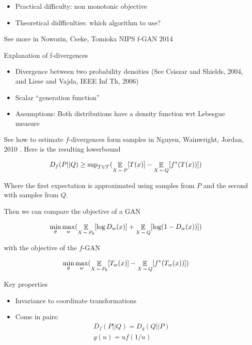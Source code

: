 \documentclass[b5paper]{report}
\begin{document}
\begin{itemize}
  \item Practical difficulty: non monotonic objective
  \item Theoretical didfficulties: which algorithm to use?
\end{itemize}


See more in Nowozin, Cseke, Tomioka NIPS f-GAN 2014 \cite{nowozin2016f}

Explanation of f-divergences

\begin{itemize}
  \item Divergence between two probability densities (See Csiszar and Shields,
    2004, and Liese and Vajda, IEEE Inf Th, 2006)
  \item Scalar ``generation function''
  \item Assumptions: Both distributions have a density function wrt Lebesgue
    measure
\end{itemize}

See how to estimate $f$-divergences form samples in Nguyen, Wainwright, Jordan,
2010 \cite{nguyen2010estimating}. Here is the resulting lowerbound

\begin{equation}
  D_f(P||Q) \ge \text{sup}_{T \in \mathcal{T}}( \operatorname*{\mathbb{\mathop{E}}}_{X\operatorname*{\sim} P}[T(x)] - \operatorname*{\mathbb{\mathop{E}}}_{X\operatorname*{\sim} Q}[f^*(T(x))])
\end{equation}

Where the first expectation is approximated using samples from $P$ and the
second with samples from $Q$.

Then we can compare the objective of a GAN

\begin{equation}
  \min_\theta \max_w ( \operatorname*{\mathbb{\mathop{E}}}_{X\operatorname*{\sim} P_\theta}[\log D_w(x)] + \operatorname*{\mathbb{\mathop{E}}}_{X\operatorname*{\sim}
  Q}[\log (1-D_w(x))])
\end{equation}

with the objective of the $f$-GAN

\begin{equation}
  \min_\theta \max_w ( \operatorname*{\mathbb{\mathop{E}}}_{X\operatorname*{\sim} P_\theta}[T_w(x)] - \operatorname*{\mathbb{\mathop{E}}}_{X\operatorname*{\sim}
  Q}[f^*(T_w(x))])
\end{equation}

Key properties

\begin{itemize}
  \item Invariance to coordinate transformations
  \item Come in pairs:
    \begin{align}
      D_f(P||Q) = D_g(Q||P) \\
      g(u) = uf(1/u)
    \end{align}
\end{itemize}
\end{document}
